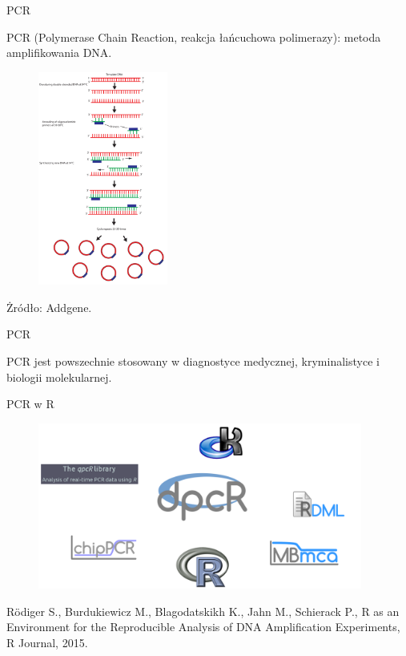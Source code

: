 \documentclass{beamer}\usepackage[]{graphicx}\usepackage[]{color}
\begin{document}
\begin{frame}{PCR}

PCR (Polymerase Chain Reaction, reakcja łańcuchowa polimerazy): metoda amplifikowania DNA.

\begin{figure} 
\includegraphics[width=0.38\textwidth]{static_figure/addgene.png}
\end{figure}

\tiny Żródło: Addgene.

\end{frame}

\begin{frame}{PCR}

PCR jest powszechnie stosowany w diagnostyce medycznej, kryminalistyce i biologii molekularnej. 

\end{frame}

\begin{frame}{PCR w R}
\begin{figure} 
\includegraphics[width=0.95\textwidth]{static_figure/pcr-universum1.png}
\end{figure}

\tiny  R\"{o}diger S., Burdukiewicz M., Blagodatskikh K., Jahn M., 
Schierack P., R as an
Environment for the Reproducible Analysis of DNA Amplification Experiments, 
R Journal, 2015.

\end{frame}
\end{document}

